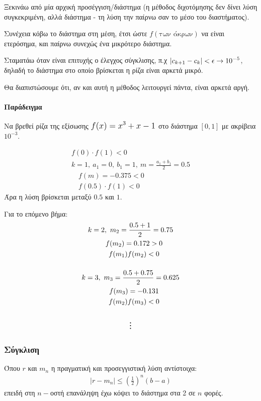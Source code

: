 \documentclass[11pt,a4paper,notitlepage,fleqn,draft]{article}
\begin{document}
	Ξεκινάω από μία αρχική προσέγγιση/διάστημα (η μέθοδος διχοτόμησης δεν δίνει λύση
	συγκεκριμένη, αλλά διάστημα - τη λύση την παίρνω σαν το μέσο του διαστήματος).
	
	Συνέχεια κόβω το διάστημα στη μέση, έτσι ώστε \( f(\text{των άκρων}) \) να είναι
	ετερόσημα, και παίρνω συνεχώς ένα μικρότερο διάστημα.
	
	Σταματάω όταν είναι επιτυχής ο έλεγχος σύγκλισης, π.χ
	\( \mathlarger{\left|c_{k+1}-c_k\right| < \epsilon \rightarrow 10^{-5}} \), δηλαδή
	το διάστημα στο οποίο βρίσκεται η ρίζα είναι αρκετά μικρό.
	
	Θα διαπιστώσουμε ότι, αν και αυτή η μέθοδος λειτουργεί πάντα, είναι αρκετά αργή.
	
	\paragraph{Παράδειγμα}
	Να βρεθεί ρίζα της εξίσωσης
	\( \mathlarger{
	\mathlarger{f(x) = x^3+x-1} }
	 \) στο διάστημα \( [0,1] \) με ακρίβεια \( 10^{-3} \).
	
	\begin{gather*}
		f(0) \cdot f(1) < 0 \\
		k=1,\ a_1=0,\ b_1=1,\ m=\frac{a_1+b_1}{2} = 0.5 \\
		\quad f(m) = -0.375 < 0 \\
		\quad f(0.5) \cdot f(1) < 0
	\end{gather*}
	Άρα η λύση βρίσκεται μεταξύ \( 0.5 \) και \( 1 \).
	
	Για το επόμενο βήμα:
	\begin{gather*}
		k = 2,\ m_2 = \frac{0.5+1}{2} = 0.75 \\
		\quad f(m_2) = 0.172 > 0 \\
		\quad f(m_1)f(m_2) < 0 \\[3ex]
		k=3,\ m_3 = \frac{0.5+0.75}{2} = 0.625 \\
		\quad f(m_3) = -0.131 \\
		\quad f(m_2)f(m_3) < 0 \\[3ex]
		\mathlarger{\mathlarger{\vdots}}
	\end{gather*}
	
	\subsubsection{Σύγκλιση}
	Όπου \( r \) και \( m_n \) η πραγματική και προσεγγιστική λύση αντίστοιχα:
	\begin{align*}
		\left|r - m_n\right| \leq \left(\frac{1}{2}\right)^n (b-a)
	\end{align*}
	επειδή στη \( n- \)οστή επανάληψη έχω κόψει το διάστημα στα 2 σε \( n \) φορές.
	
\end{document}

